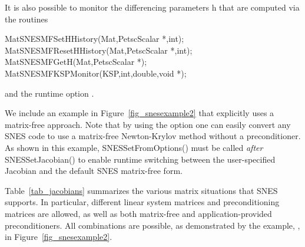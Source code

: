 It is also possible to monitor the differencing parameters h that are computed
via the routines
\begin{tabbing}
   MatSNESMFSetHHistory(Mat,PetscScalar *,int);\\
   MatSNESMFResetHHistory(Mat,PetscScalar *,int);\\
   MatSNESMFGetH(Mat,PetscScalar *);\\
   MatSNESMFKSPMonitor(KSP,int,double,void *);
\end{tabbing}
and the runtime option  . 

We include an example in Figure~\ref{fig_snesexample2} that explicitly
uses a matrix-free approach.  Note that by using the option 
 one can easily convert any SNES code to use a matrix-free
Newton-Krylov method without a preconditioner.  As shown in this
example, SNESSetFromOptions() must be called {\em after}
SNESSetJacobian() to enable runtime switching between the
user-specified Jacobian and the default SNES matrix-free form.

Table~\ref{tab_jacobians} summarizes the various matrix situations
that SNES supports.  In particular, different linear system matrices
and preconditioning matrices are allowed, as well as both matrix-free
and application-provided preconditioners.  All combinations are
possible, as demonstrated by the example, 
,
 in Figure~\ref{fig_snesexample2}.

